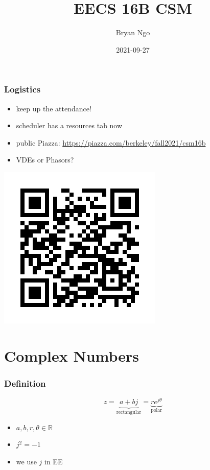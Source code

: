 \documentclass[aspectratio=169]{beamer}
\title{EECS 16B CSM}
\author{Bryan Ngo}
\date{2021-09-27}
\institute{Computer Science Mentors}
\newcommand{\R}{\mathbb{R}}
\begin{document}
\begin{frame}
    \maketitle
\end{frame}

\begin{frame}
    \frametitle{Logistics}

    \begin{itemize}
        \item keep up the attendance!
        \item scheduler has a resources tab now
        \item public Piazza: \url{https://piazza.com/berkeley/fall2021/csm16b}
        \item VDEs or Phasors?
    \end{itemize}
    \includegraphics[height=0.7\textheight]{piazza-qr.png}
\end{frame}

\begin{frame}
    \tableofcontents
\end{frame}

\section{Complex Numbers}

\begin{frame}
    \frametitle{Definition}

    \begin{equation}
        z = \underbrace{a + bj}_{\text{rectangular}} = \underbrace{r e^{j \theta}}_{\text{polar}}
    \end{equation}
    \begin{itemize}
        \item \(a, b, r, \theta \in \R\)
        \item \(j^2 = -1\)
        \item we use \(j\) in EE
    \end{itemize}
\end{frame}
\end{document}
